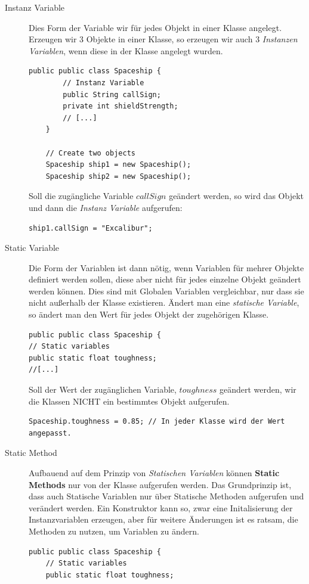\begin{description}
\item[Instanz Variable] Dies Form der Variable wir für jedes Objekt in einer Klasse angelegt. Erzeugen wir 3 Objekte in einer Klasse, so erzeugen wir auch 3 \textit{Instanzen Variablen}, wenn diese in der Klasse angelegt wurden. 
\begin{lstlisting}[style=C++]
	public public class Spaceship {
		// Instanz Variable
		public String callSign;
		private int shieldStrength;
		// [...]
	}
	
	// Create two objects
	Spaceship ship1 = new Spaceship();
	Spaceship ship2 = new Spaceship();
\end{lstlisting}
Soll die zugängliche Variable $callSign$ geändert werden, so wird das Objekt und dann die \textit{Instanz Variable} aufgerufen:
\begin{lstlisting}[style=C++]
	ship1.callSign = "Excalibur";
\end{lstlisting}
\item[Static Variable] Die Form der Variablen ist dann nötig, wenn Variablen für mehrer Objekte definiert werden sollen, diese aber nicht für jedes einzelne Objekt geändert werden können. Dies sind mit Globalen Variablen vergleichbar, nur dass sie nicht außerhalb der Klasse existieren. Ändert man eine \textit{statische Variable}, so ändert man den Wert für jedes Objekt der zugehörigen Klasse.
\begin{lstlisting}[style=C++]
public public class Spaceship {
// Static variables
public static float toughness;
//[...]
\end{lstlisting}
Soll der Wert der zugänglichen Variable, $toughness$ geändert werden, wir die Klassen NICHT ein bestimmtes Objekt aufgerufen.
\begin{lstlisting}[style=C++]
Spaceship.toughness = 0.85; // In jeder Klasse wird der Wert angepasst.
\end{lstlisting}
\item[Static Method] Aufbauend auf dem Prinzip von \textit{Statischen Variablen} können \textbf{Static Methods} nur von der Klasse aufgerufen werden. Das Grundprinzip ist, dass auch Statische Variablen nur über Statische Methoden aufgerufen und verändert werden. Ein Konstruktor kann so, zwar eine Initalisierung der Instanzvariablen erzeugen, aber für weitere Änderungen ist es ratsam, die Methoden zu nutzen, um Variablen zu ändern. 
\begin{lstlisting}[style=C++]
public public class Spaceship {
	// Static variables
	public static float toughness;

\end{lstlisting}
\end{description}
